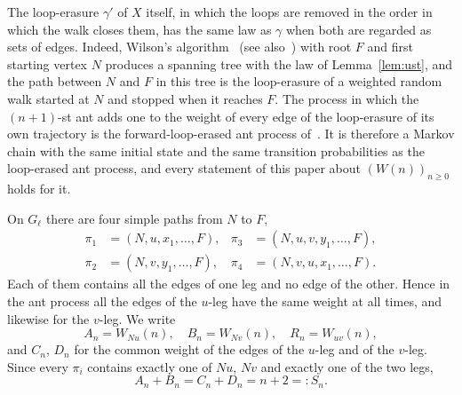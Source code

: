 \documentclass[11pt]{amsart}
\theoremstyle{remark}
\begin{document}
The loop-erasure $\gamma'$ of $X$ itself, in which the loops are removed in the order in which the walk closes them,
has the same law as $\gamma$ when both are regarded as sets of edges. Indeed, Wilson's algorithm~\cite{Wilson} (see
also~\cite[Chapter~4]{LP}) with root $F$ and first starting vertex $N$ produces a spanning tree with the law of
Lemma~\ref{lem:ust}, and the path between $N$ and $F$ in this tree is the loop-erasure of a weighted random walk
started at $N$ and stopped when it reaches $F$. The process in which the $(n+1)$-st ant adds one to the weight of
every edge of the loop-erasure of its own trajectory is the forward-loop-erased ant process of~\cite{AM}. It is
therefore a Markov chain with the same initial state and the same transition probabilities as the loop-erased ant
process, and every statement of this paper about $(W(n))_{n\ge0}$ holds for it.

On $G_\ell$ there are four simple paths from $N$ to $F$,
\begin{align*}
\pi_1&=(N,u,x_1,\dots,F), & \pi_3&=(N,u,v,y_1,\dots,F),\\
\pi_2&=(N,v,y_1,\dots,F), & \pi_4&=(N,v,u,x_1,\dots,F).
\end{align*}
Each of them contains all the edges of one leg and no edge of the other. Hence in the ant process all the edges of the
$u$-leg have the same weight at all times, and likewise for the $v$-leg. We write
\[
A_n=W_{Nu}(n),\quad B_n=W_{Nv}(n),\quad R_n=W_{uv}(n),
\]
and $C_n$, $D_n$ for the common weight of the edges of the $u$-leg and of the $v$-leg. Since every $\pi_i$ contains
exactly one of $Nu$, $Nv$ and exactly one of the two legs,
\begin{equation}\label{eq:sum}
A_n+B_n=C_n+D_n=n+2=:S_n .
\end{equation}
\end{document}
